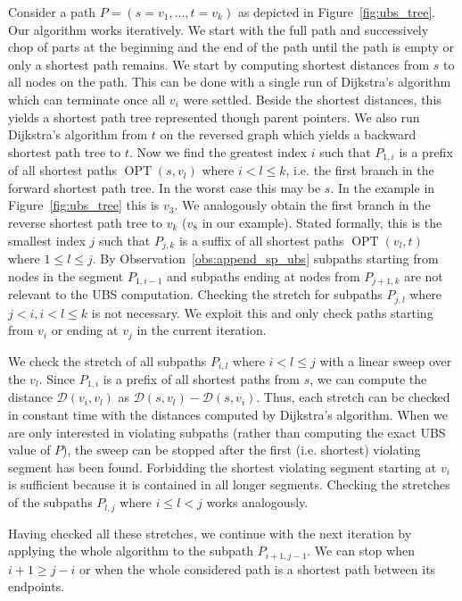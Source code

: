 \documentclass[a4paper,UKenglish,cleveref, autoref, thm-restate]{lipics-v2021}
\newcommand*{\dist}{\mathcal{D}}
\newcommand*{\shp}{\operatorname{OPT}}
\begin{document}
Consider a path $P=(s=v_1,\dots,t=v_k)$ as depicted in Figure~\ref{fig:ubs_tree}.
Our algorithm works iteratively.
We start with the full path and successively chop of parts at the beginning and the end of the path until the path is empty or only a shortest path remains.
We start by computing shortest distances from $s$ to all nodes on the path.
This can be done with a single run of Dijkstra's algorithm which can terminate once all $v_i$ were settled.
Beside the shortest distances, this yields a shortest path tree represented though parent pointers.
We also run Dijkstra's algorithm from $t$ on the reversed graph which yields a backward shortest path tree to $t$.
Now we find the greatest index $i$ such that $P_{1,i}$ is a prefix of all shortest paths $\shp(s, v_l)$ where $i < l \leq k$, i.e. the first branch in the forward shortest path tree.
In the worst case this may be $s$.
In the example in Figure~\ref{fig:ubs_tree} this is $v_3$.
We analogously obtain the first branch in the reverse shortest path tree to $v_k$ ($v_8$ in our example).
Stated formally, this is the smallest index $j$ such that $P_{j,k}$ is a suffix of all shortest paths $\shp(v_l, t)$ where $1 \leq l \leq j$.
By Observation~\ref{obs:append_sp_ubs} subpaths starting from nodes in the segment $P_{1,i-1}$ and subpaths ending at nodes from $P_{j+1,k}$ are not relevant to the UBS computation.
Checking the stretch for subpaths $P_{j,l}$ where $j < i, i < l \leq k$ is not necessary.
We exploit this and only check paths starting from $v_i$ or ending at $v_j$ in the current iteration.

We check the stretch of all subpaths $P_{i,l}$ where $i < l \leq j$ with a linear sweep over the $v_l$.
Since $P_{1,i}$ is a prefix of all shortest paths from $s$, we can compute the distance $\dist(v_i, v_l)$ as $\dist(s, v_l) - \dist(s, v_i)$.
Thus, each stretch can be checked in constant time with the distances computed by Dijkstra's algorithm.
When we are only interested in violating subpaths (rather than computing the exact UBS value of $P$), the sweep can be stopped after the first (i.e. shortest) violating segment has been found.
Forbidding the shortest violating segment starting at $v_i$ is sufficient because it is contained in all longer segments.
Checking the stretches of the subpaths $P_{l,j}$ where $i \leq l < j$ works analogously.

Having checked all these stretches, we continue with the next iteration by applying the whole algorithm to the subpath $P_{i+1,j-1}$.
We can stop when $i+1 \geq j-i$ or when the whole considered path is a shortest path between its endpoints.
\end{document}
